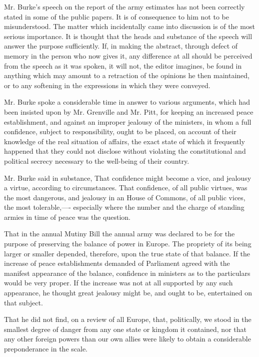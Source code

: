 Mr. Burke's speech on the report of the army estimates has not been correctly stated in some of the public papers. It is of consequence to him not to be misunderstood. The matter which incidentally came into discussion is of the most serious importance. It is thought that the heads and substance of the speech will answer the purpose sufficiently. If, in making the abstract, through defect of memory in the person who now gives it, any difference at all should be perceived from the speech as it was spoken, it will not, the editor imagines, be found in anything which may amount to a retraction of the opinions he then maintained, or to any softening in the expressions in which they were conveyed.

Mr. Burke spoke a considerable time in answer to various arguments, which had been insisted upon by Mr. Grenville and Mr. Pitt, for keeping an increased peace establishment, and against an improper jealousy of the ministers, in whom a full confidence, subject to responsibility, ought to be placed, on account of their knowledge of the real situation of affairs, the exact state of which it frequently happened that they could not disclose without violating the constitutional and political secrecy necessary to the well-being of their country.

Mr. Burke said in substance, That confidence might become a vice, and jealousy a virtue, according to circumstances. That confidence, of all public virtues, was the most dangerous, and jealousy in an House of Commons, of all public vices, the most tolerable,—- especially where the number and the charge of standing armies in time of peace was the question.

That in the annual Mutiny Bill the annual army was declared to be for the purpose of preserving the balance of power in Europe. The propriety of its being larger or smaller depended, therefore, upon the true state of that balance. If the increase of peace establishments demanded of Parliament agreed with the manifest appearance of the balance, confidence in ministers as to the particulars would be very proper. If the increase was not at all supported by any such appearance, he thought great jealousy might be, and ought to be, entertained on that subject.

That he did not find, on a review of all Europe, that, politically, we stood in the smallest degree of danger from any one state or kingdom it contained, nor that any other foreign powers than our own allies were likely to obtain a considerable preponderance in the scale.

